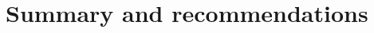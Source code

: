 \documentclass[utf8]{frontiersSCNS} %
\begin{document}





\section{Summary and recommendations}
\end{document}
